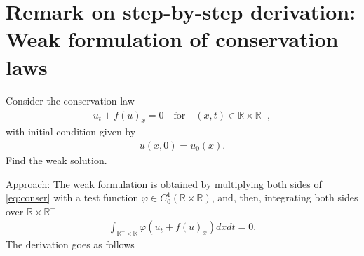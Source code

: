 \documentclass[12pt]{article}
\begin{document}
\section{Remark on step-by-step derivation: Weak formulation of conservation laws}
\begin{example}
	Consider the conservation law
	\begin{align}\label{eq:conser}
		u_{t} + f(u)_{x} = 0\quad\text{for}\quad(x,t)\in\mathbb{R}\times\mathbb{R}^{+},
	\end{align}
	with initial condition given by 
	\begin{align*}
		u(x,0) = u_{0}(x).
	\end{align*}
	Find the weak solution.
\end{example}
Approach: The weak formulation is obtained by multiplying both sides of \eqref{eq:conser}
with a test function 
$\varphi \in C^{1}_{0}(\mathbb{R}\times\mathbb{R})$,
and, then, integrating both sides over $\mathbb{R}\times\mathbb{R}^{+}$
\begin{align}\label{eq:conweak}
	\int_{\mathbb{R}^{+}\times\mathbb{R}} \varphi \left(u_{t} + f(u)_{x}\right)dxdt = 0 .
\end{align}
The derivation goes as follows
\end{document}
